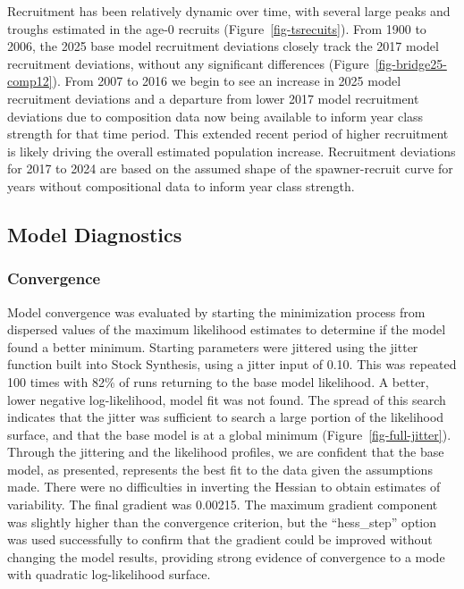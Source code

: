 \documentclass[
  english,
]{article}
\begin{document}
Recruitment has been relatively dynamic over time, with several large
peaks and troughs estimated in the age-0 recruits
(Figure~\ref{fig-tsrecuits}). From 1900 to 2006, the 2025 base model
recruitment deviations closely track the 2017 model recruitment
deviations, without any significant differences
(Figure~\ref{fig-bridge25-comp12}). From 2007 to 2016 we begin to see an
increase in 2025 model recruitment deviations and a departure from lower
2017 model recruitment deviations due to composition data now being
available to inform year class strength for that time period. This
extended recent period of higher recruitment is likely driving the
overall estimated population increase. Recruitment deviations for 2017
to 2024 are based on the assumed shape of the spawner-recruit curve for
years without compositional data to inform year class strength.

\subsection{Model Diagnostics}\label{model-diagnostics}

\subsubsection{Convergence}\label{convergence}

Model convergence was evaluated by starting the minimization process
from dispersed values of the maximum likelihood estimates to determine
if the model found a better minimum. Starting parameters were jittered
using the jitter function built into Stock Synthesis, using a jitter
input of 0.10. This was repeated 100 times with 82\% of runs returning
to the base model likelihood. A better, lower negative log-likelihood,
model fit was not found. The spread of this search indicates that the
jitter was sufficient to search a large portion of the likelihood
surface, and that the base model is at a global minimum
(Figure~\ref{fig-full-jitter}). Through the jittering and the likelihood
profiles, we are confident that the base model, as presented, represents
the best fit to the data given the assumptions made. There were no
difficulties in inverting the Hessian to obtain estimates of
variability. The final gradient was 0.00215. The maximum gradient
component was slightly higher than the convergence criterion, but the
``hess\_step'' option was used successfully to confirm that the gradient
could be improved without changing the model results, providing strong
evidence of convergence to a mode with quadratic log-likelihood surface.
\end{document}
